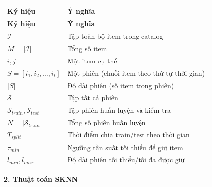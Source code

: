 \documentclass[12pt, a4paper]{article}
\begin{document}
\begin{longtable}{@{}p{4.2cm} p{11cm}@{}}
\toprule
\textbf{Ký hiệu} & \textbf{Ý nghĩa} \\
\midrule
\endfirsthead
\toprule
\textbf{Ký hiệu} & \textbf{Ý nghĩa} \\
\midrule
\endhead
\bottomrule
\endfoot

$\mathcal{I}$                                & Tập toàn bộ item trong catalog \\
$M = |\mathcal{I}|$                          & Tổng số item \\
$i, j$                                       & Một item cụ thể \\
$S = [i_1, i_2, \ldots, i_t]$                & Một phiên (chuỗi item theo thứ tự thời gian) \\
$|S|$                                        & Độ dài phiên (số item trong phiên) \\
$\mathcal{S}$                                & Tập tất cả phiên \\
$\mathcal{S}_{train}, \mathcal{S}_{test}$    & Tập phiên huấn luyện và kiểm tra \\
$N = |\mathcal{S}_{train}|$                  & Tổng số phiên huấn luyện \\
$T_{split}$                                  & Thời điểm chia train/test theo thời gian \\
$\tau_{min}$                                 & Ngưỡng tần suất tối thiểu để giữ item \\
$l_{min}, l_{max}$                           & Độ dài phiên tối thiểu/tối đa được giữ \\

\end{longtable}

\textbf{2. Thuật toán SKNN}
\end{document}
